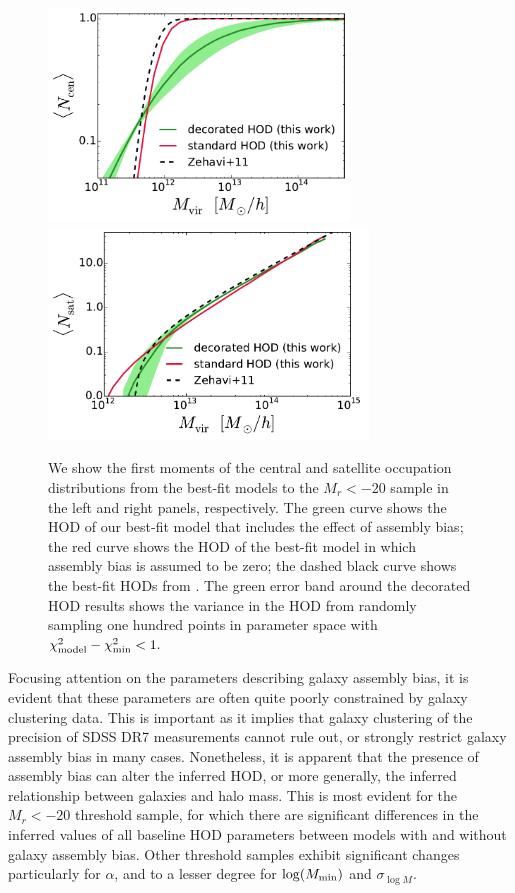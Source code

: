 \documentclass[usenatbib,usegraphicx,letterpaper]{mn2e}
\newcommand{\magr}{M_r}
\begin{document}
\begin{figure}
\begin{center}
\includegraphics[width=8.0cm]{central_hod_comparison.pdf}
\includegraphics[width=8.5cm]{satellite_hod_comparison.pdf}
\caption{
We show the first moments of the central and satellite occupation distributions 
from the best-fit models to the $\magr<-20$ sample in the left and right 
panels, respectively. The green curve shows the HOD of our best-fit model 
that includes the effect of assembly bias; the red curve shows the HOD 
of the best-fit model in which assembly bias is assumed to be zero; 
the dashed black curve shows the best-fit HODs from \citet{zehavi_etal11}. 
The green error band around the decorated HOD results shows the variance 
in the HOD from randomly sampling one hundred points in parameter space 
with $\chi^{2}_{\rm model} - \chi^{2}_{\rm min} < 1.$
}
\label{fig:directhodcomparison}
\end{center}
\end{figure}

Focusing attention on the parameters describing galaxy assembly bias, it is 
evident that these parameters are often quite poorly constrained by galaxy 
clustering data. This is important as it implies that galaxy clustering of the precision 
of SDSS DR7 measurements cannot rule out, or strongly restrict galaxy assembly 
bias in many cases. Nonetheless, it is apparent that the presence of assembly bias 
can alter the inferred HOD, or more generally, the inferred relationship between 
galaxies and halo mass. This is most evident for the $M_r < -20$ threshold sample, 
for which there are significant differences in the inferred values of all baseline HOD 
parameters between models with and without galaxy assembly bias. Other threshold 
samples exhibit significant changes particularly for $\alpha$, and to a lesser degree 
for $\log (M_{\rm min})$ and $\sigma_{\log M}$. 
\end{document}
